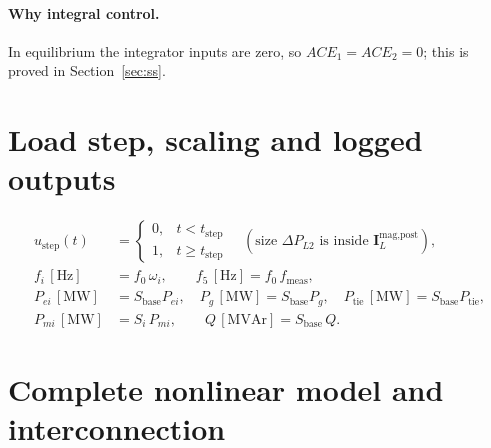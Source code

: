 \documentclass[11pt,a4paper]{article}
\numberwithin{equation}{section}
\begin{document}
\paragraph{Why integral control.} In equilibrium the integrator inputs are zero, so $ACE_1 = ACE_2 = 0$; this is proved in Section~\ref{sec:ss}.

\section{Load step, scaling and logged outputs}
\begin{align}
u_{\text{step}}(t) &= \begin{cases}0,& t<t_{\text{step}}\\1,& t\ge t_{\text{step}}\end{cases}
\quad(\text{size } \Delta P_{L2} \text{ is inside } \bm I_L^{\text{mag,post}}),\\
f_i\,[\text{Hz}] &= f_0\,\omega_i,\qquad f_{5}\,[\text{Hz}] = f_0\,f_{\text{meas}},\\
P_{ei}\,[\text{MW}] &= S_{\text{base}}P_{ei},\quad P_g\,[\text{MW}] = S_{\text{base}}P_g,\quad P_{\text{tie}}\,[\text{MW}] = S_{\text{base}}P_{\text{tie}},\\
P_{mi}\,[\text{MW}] &= S_i\,P_{mi},\qquad Q\,[\text{MVAr}] = S_{\text{base}}\,Q .
\end{align}

\section{Complete nonlinear model and interconnection}
\end{document}
